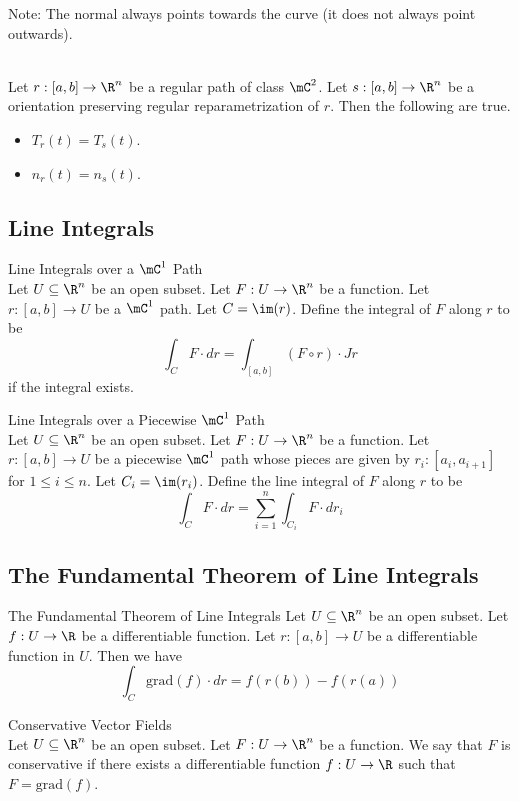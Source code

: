 \documentclass[a4paper]{article}
\begin{document}
Note: The normal always points towards the curve (it does not always point outwards). 

\begin{prp}{}{}\\
Let $r:[a,b]\to\R^n$ be a regular path of class $\mC^2$. Let $s:[a,b]\to\R^n$ be a orientation preserving regular reparametrization of $r$. Then the following are true. 
\begin{itemize}
\item $T_r(t)=T_s(t)$. 
\item $n_r(t)=n_s(t)$. 
\end{itemize}
\end{prp}

\subsection{Line Integrals}
\begin{defn}{Line Integrals over a $\mC^1$ Path}{}\\
Let $U\subseteq\R^n$ be an open subset. Let $F:U\to\R^n$ be a function. Let $r:[a,b]\to U$ be a $\mC^1$ path. Let $C=\im(r)$. Define the integral of $F$ along $r$ to be $$\int_CF\cdot dr=\int_{[a,b]}(F\circ r)\cdot Jr$$ if the integral exists. 
\end{defn}

\begin{defn}{Line Integrals over a Piecewise $\mC^1$ Path}{}\\
Let $U\subseteq\R^n$ be an open subset. Let $F:U\to\R^n$ be a function. Let $r:[a,b]\to U$ be a piecewise $\mC^1$ path whose pieces are given by $r_i:[a_i,a_{i+1}]$ for $1\leq i\leq n$. Let $C_i=\im(r_i)$. Define the line integral of $F$ along $r$ to be $$\int_CF\cdot dr=\sum_{i=1}^n\int_{C_i}F\cdot dr_i$$
\end{defn}

\subsection{The Fundamental Theorem of Line Integrals}
\begin{thm}{The Fundamental Theorem of Line Integrals}{}
Let $U\subseteq\R^n$ be an open subset. Let $f:U\to\R$ be a differentiable function. Let $r:[a,b]\to U$ be a differentiable function in $U$. Then we have $$\int_C\text{grad}(f)\cdot dr=f(r(b))-f(r(a))$$
\end{thm}

\begin{defn}{Conservative Vector Fields}{}\\
Let $U\subseteq\R^n$ be an open subset. Let $F:U\to\R^n$ be a function. We say that $F$ is conservative if there exists a differentiable function $f:U\to\R$ such that $F=\text{grad}(f)$. 
\end{defn}
\end{document}
